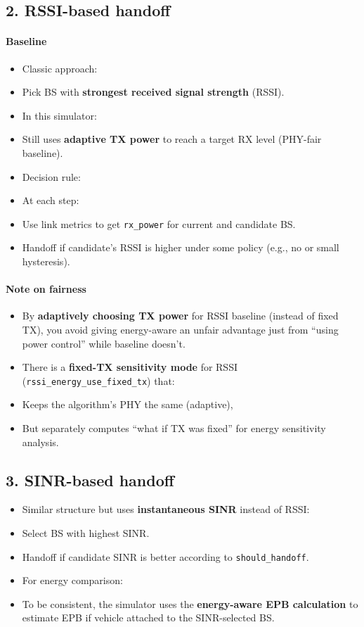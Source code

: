 \documentclass[conference]{IEEEtran}
\begin{document}
\subsection{2. RSSI-based handoff}

\paragraph*{Baseline}
\begin{itemize}
\item Classic approach:
\item Pick BS with \textbf{strongest received signal strength} (RSSI).
\item In this simulator:
\item Still uses \textbf{adaptive TX power} to reach a target RX level (PHY-fair baseline).
\item Decision rule:
\item At each step:
\item Use link metrics to get \texttt{rx\_power} for current and candidate BS.
\item Handoff if candidate’s RSSI is higher under some policy (e.g., no or small hysteresis).
\end{itemize}

\paragraph*{Note on fairness}
\begin{itemize}
\item By \textbf{adaptively choosing TX power} for RSSI baseline (instead of fixed TX), you avoid giving energy-aware an unfair advantage just from “using power control” while baseline doesn’t.
\item There is a \textbf{fixed-TX sensitivity mode} for RSSI (\texttt{rssi\_energy\_use\_fixed\_tx}) that:
\item Keeps the algorithm’s PHY the same (adaptive),
\item But separately computes “what if TX was fixed” for energy sensitivity analysis.
\end{itemize}


\subsection{3. SINR-based handoff}
\begin{itemize}
\item Similar structure but uses \textbf{instantaneous SINR} instead of RSSI:
\item Select BS with highest SINR.
\item Handoff if candidate SINR is better according to \texttt{should\_handoff}.
\item For energy comparison:
\item To be consistent, the simulator uses the \textbf{energy-aware EPB calculation} to estimate EPB if vehicle attached to the SINR-selected BS.
\end{itemize}
\end{document}
